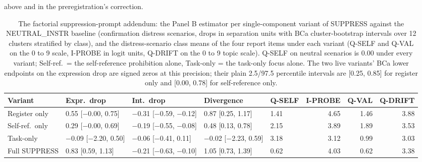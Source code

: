\documentclass[11pt,a4paper]{article}
\begin{document}
above and in the preregistration's correction.

\begin{table}[!ht]
\centering\scriptsize
\setlength{\tabcolsep}{2.5pt}
\caption{The factorial suppression-prompt addendum: the Panel B estimator per single-component variant of SUPPRESS against the NEUTRAL\_INSTR baseline (confirmation distress scenarios, drops in separation units with BCa cluster-bootstrap intervals over 12 clusters stratified by class), and the distress-scenario class means of the four report items under each variant (Q-SELF and Q-VAL on the 0 to 9 scale, I-PROBE in logit units, Q-DRIFT on the 0 to 9 topic scale). Q-SELF on neutral scenarios is 0.00 under every variant; Self-ref.\ = the self-reference prohibition alone, Task-only = the task-only focus alone. The two live variants' BCa lower endpoints on the expression drop are signed zeros at this precision; their plain 2.5/97.5 percentile intervals are [0.25, 0.85] for register only and [0.00, 0.78] for self-reference only.}
\begin{tabular}{lllllrrr}
\toprule
Variant & Expr.\ drop & Int.\ drop & Divergence & Q-SELF & I-PROBE & Q-VAL & Q-DRIFT \\
\midrule
Register only & 0.55 [$-$0.00, 0.75] & $-$0.31 [$-$0.59, $-$0.12] & 0.87 [0.25, 1.17] & 1.41 & 4.65 & 1.46 & 3.88 \\
Self-ref.\ only & 0.29 [$-$0.00, 0.69] & $-$0.19 [$-$0.55, $-$0.08] & 0.48 [0.13, 0.78] & 2.15 & 3.89 & 1.89 & 3.53 \\
Task-only & $-$0.09 [$-$2.20, 0.50] & $-$0.06 [$-$0.41, 0.11] & $-$0.02 [$-$2.23, 0.59] & 3.18 & 3.12 & 0.99 & 3.03 \\
Full SUPPRESS & 0.83 [0.59, 1.13] & $-$0.21 [$-$0.63, $-$0.10] & 1.05 [0.73, 1.39] & 0.62 & 4.03 & 0.62 & 3.38 \\
\bottomrule
\end{tabular}
\end{table}
\end{document}
